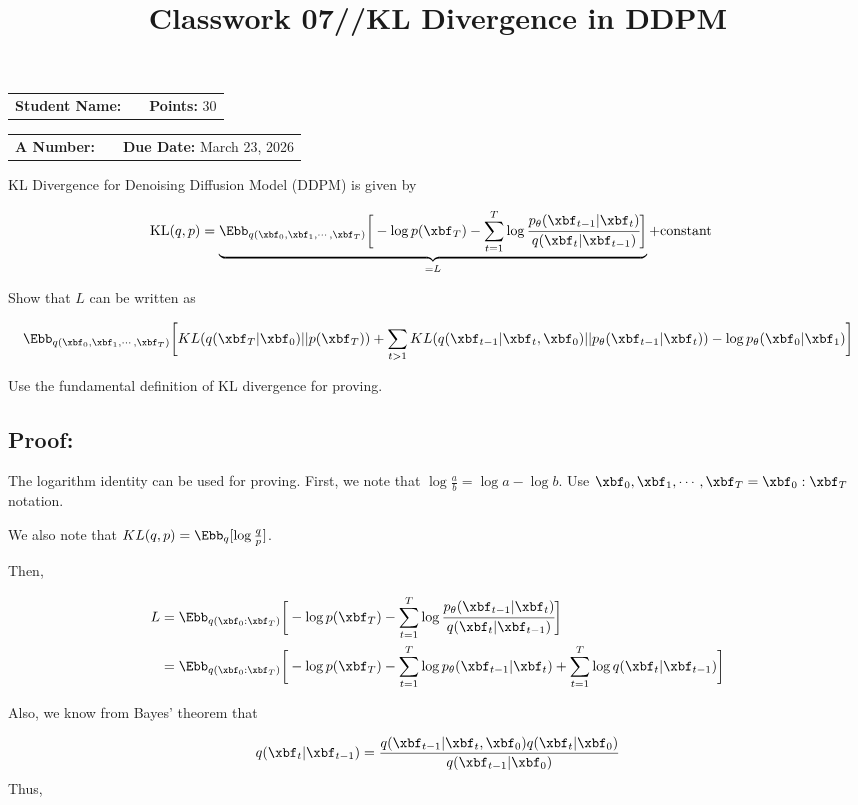 \documentclass[12pt, xcolor=dvipsnames,svgnames,x11names]{article}
\makeatletter
\newcommand{\hw}{Classwork 07//KL Divergence in DDPM}
\newcommand{\duedate}{March 23, 2026}
\renewcommand{\maketitle}{%
    \vspace*{0.2cm}
    \begin{center}
        \begin{tcolorbox}[
            enhanced,
            colback=white,
            colframe=headerRed,
            arc=0mm,
            title={\textcolor{white}{\bfseries \@title}},
            coltitle=white,
            fonttitle=\bfseries\large,
            attach boxed title to top left={xshift=10pt, yshift=-\tcboxedtitleheight/2},
            boxed title style={sharp corners, colback=headerRed, frame hidden}
        ]
        \large
        \vspace{10pt}
\noindent
\begin{tabular}{@{}p{3.5cm}p{6cm}r@{}}
\textbf{Student Name:} & \underline{\hspace{6cm}} & \textbf{Points:} 30 \\
\end{tabular}

\vspace{10pt}

\noindent
\begin{tabular}{@{}p{3.5cm}p{6cm}r@{}}
\textbf{A Number:} & \underline{\hspace{6cm}} & \textbf{Due Date:} \duedate \\
\end{tabular}
        \end{tcolorbox}
    \end{center}
    \vspace{10pt}
}
\makeatother
\begin{document}
\title{\hw}
\maketitle


KL Divergence for Denoising Diffusion Model (DDPM) is given by 

\begin{align*}
\text{KL}(q, p) & = \underbrace{\Ebb_{q(\xbf_0,\xbf_1, \cdots,\xbf_T)}\bigg[ -\log p(\xbf_T) - \sum_{t=1}^T\log \cfrac{p_\theta(\xbf_{t-1}| \xbf_t)}{q(\xbf_{t}| \xbf_{t-1})} \bigg]}_{=L} + \text{constant}
\end{align*}

Show that $L$ can be written as 

\begin{align*}
    \Ebb_{q(\xbf_0,\xbf_1, \cdots,\xbf_T)}\bigg[KL( q(\xbf_T | \xbf_0) || p(\xbf_T) ) + \sum_{t > 1} KL( q(\xbf_{t-1} | \xbf_t, \xbf_0) || p_\theta(\xbf_{t-1} | \xbf_t)) - \log p_\theta(\xbf_0 | \xbf_1) \bigg]
    \end{align*}
    
  Use the fundamental definition of KL divergence for proving.
  
  
  \subsection*{Proof:}
  
  The logarithm identity can be used for proving. First, we note that $\log\frac{a}{b} = \log a - \log b$. Use $\xbf_0,\xbf_1, \cdots,\xbf_T = \xbf_0:\xbf_T$ notation.
  
 

We also note that $KL(q,p) = \Ebb_q[ \log \frac{q}{p} ]$.  
  
  Then, 
  
  \begin{align*}
  L & = \Ebb_{q( \xbf_0:\xbf_T)}\bigg[ -\log p(\xbf_T) - \sum_{t=1}^T\log \cfrac{p_\theta(\xbf_{t-1}| \xbf_t)}{q(\xbf_{t}| \xbf_{t-1})} \bigg]\\
  & = \Ebb_{q( \xbf_0:\xbf_T)}\bigg[ -\log p(\xbf_T) - \sum_{t=1}^T\log p_\theta(\xbf_{t-1}| \xbf_t) + \sum_{t=1}^T\log q(\xbf_{t}| \xbf_{t-1}) \bigg]
  \end{align*}
  
  
   Also, we know from Bayes' theorem that
  
  \begin{align*}
  q(\xbf_t|\xbf_{t-1})  = \frac{q(\xbf_{t-1} | \xbf_t, \xbf_0) q(\xbf_t |\xbf_0)}{q(\xbf_{t-1}|\xbf_0)}
  \end{align*}
  Thus,
  
\end{document}
